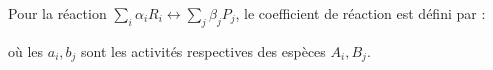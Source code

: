 ﻿\documentclass[a4paper]{article}
\begin{document}
\pagestyle{fancy}
\fancyhf{}
\setlength{\headheight}{15pt}

\begin{center}
	\large{}
\end{center}


Pour la réaction \(\sum_i\alpha_iR_i \leftrightarrow \sum_j\beta_jP_j\), le coefficient de réaction est défini par :
\begin{center}
\end{center}
où les \(a_i,b_j\) sont les activités respectives des espèces \(A_i,B_j\).
\end{document}
